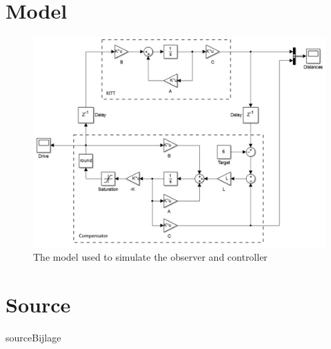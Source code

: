\documentclass[final]{scrreprt} %
\begin{document}
\begin{appendices}
\renewcommand{\chapternumber}{\appendixname\space\thechapter} 
\chapter{Model}
\label{app:model}
\begin{figure}[H]
	\centering    	
    	\includegraphics[width=\textwidth]{resources/model.png}
    	\caption{The model used to simulate the observer and controller}
    	\label{app:model}
\end{figure}
\chapter{Source}
\label{app:source}
{sourceBijlage}

\end{appendices}
\end{document}

